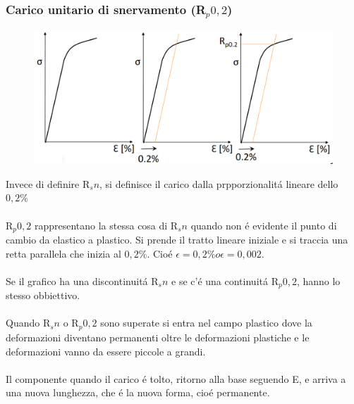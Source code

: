 \documentclass{article}
\begin{document}
{            \subsubsection{Carico unitario di snervamento (R$_p 0,2$)}
                \begin{figure}[!h]
                    \centering
                    \includegraphics[width=.85\linewidth]{Carica Unitario di Snervamento p02.png}
                \end{figure}
                Invece di definire R$_sn$, si definisce il carico dalla prpporzionalit\'a lineare dello $0,2\%$\\ \\
                R$_p 0,2$ rappresentano la stessa cosa di R$_sn$ quando non \'e evidente il punto di cambio da elastico a plastico. Si prende il tratto lineare iniziale e si traccia una retta parallela che inizia al $0,2\%$. Cio\'e $\epsilon = 0,2\% o \epsilon = 0,002$.\\ \\
                Se il grafico ha una discontinuit\'a R$_sn$ e se c'\'e una continuit\'a R$_p 0,2$, hanno lo stesso obbiettivo.\\ \\
                Quando R$_sn$ o R$_p 0,2$ sono superate si entra nel campo plastico dove la deformazioni diventano permanenti oltre le deformazioni plastiche e le deformazioni vanno da essere piccole a grandi.\\ \\
                Il componente quando il carico \'e tolto, ritorno alla base seguendo E, e arriva a una nuova lunghezza, che \'e la nuova forma, cio\'e permanente.
}
\end{document}
